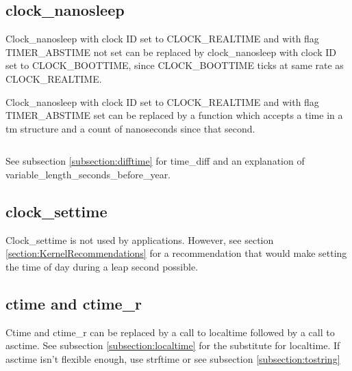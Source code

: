 \documentclass[letterpaper,twoside]{article}
\begin{document}
\subsection{clock\_nanosleep}
Clock\_nanosleep with clock ID set to CLOCK\_REAL\-TIME and with flag
TIMER\_ABS\-TIME not set can be replaced by clock\_nanosleep with
clock ID set to CLOCK\_BOOTTIME, since CLOCK\_BOOTTIME ticks at
same rate as CLOCK\_REAL\-TIME.

Clock\_nanosleep with clock ID set to CLOCK\_REAL\-TIME and with flag
TIMER\_ABS\-TIME set can be replaced by a function which accepts
a time in a {\ttfamily tm} structure and a count of nanoseconds
since that second.
\inputminted[firstline=32]{c}{src/time_sleep_until.c}
See subsection \ref{subsection:difftime} for time\_diff
and an explanation of variable\_length\_sec\-onds\_before\_year.

\subsection{clock\_settime}
Clock\_settime is not used by applications.
However, see section \ref{section:KernelRecommendations} for a
recommendation that would make setting the time of day during a
leap second possible.

\subsection{ctime and ctime\_r}
Ctime and ctime\_r can be replaced by a call to localtime followed by
a call to asctime.  See subsection \ref{subsection:localtime}
for the substitute for localtime.
If asctime isn't flexible enough, use strftime or see subsection
\ref{subsection:tostring}
\end{document}
